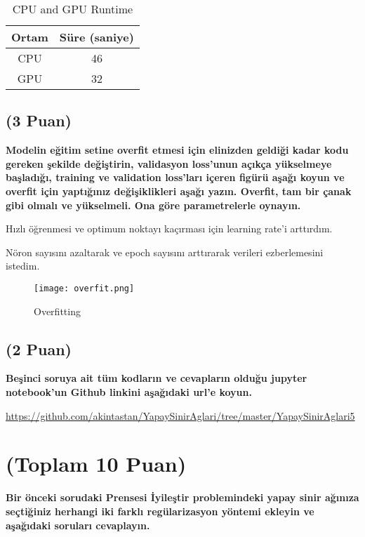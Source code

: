 \documentclass[11pt]{article}
\begin{document}
\begin{table}[ht!]
    \centering
    \caption{CPU and GPU Runtime}
    \begin{tabular}{c|c}
        Ortam & Süre (saniye) \\\hline
        CPU & 46 \\
        GPU & 32\\
    \end{tabular}
    \label{tab:my_table}
\end{table}

\subsection{(3 Puan)} \textbf{Modelin eğitim setine overfit etmesi için elinizden geldiği kadar kodu gereken şekilde değiştirin, validasyon loss'unun açıkça yükselmeye başladığı, training ve validation loss'ları içeren figürü aşağı koyun ve overfit için yaptığınız değişiklikleri aşağı yazın. Overfit, tam bir çanak gibi olmalı ve yükselmeli. Ona göre parametrelerle oynayın.}

Hızlı öğrenmesi ve optimum noktayı kaçırması için learning rate'i arttırdım.

Nöron sayısını azaltarak ve epoch sayısını arttırarak verileri ezberlemesini istedim.

\begin{figure}[ht!]
    \centering
    \texttt{[image: overfit.png]}
    \caption{Overfitting}
    \label{fig:my_pic}
\end{figure}

\subsection{(2 Puan)} \textbf{Beşinci soruya ait tüm kodların ve cevapların olduğu jupyter notebook'un Github linkini aşağıdaki url'e koyun.}

\url{https://github.com/akintastan/YapaySinirAglari/tree/master/YapaySinirAglari5}

\section{(Toplam 10 Puan)} \textbf{Bir önceki sorudaki Prensesi İyileştir problemindeki yapay sinir ağınıza seçtiğiniz herhangi iki farklı regülarizasyon yöntemi ekleyin ve aşağıdaki soruları cevaplayın.} 
\end{document}
